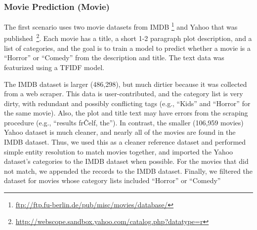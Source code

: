 \subsubsection{Movie Prediction (Movie)}\label{imdb}
The first scenario uses two movie datasets from IMDB \footnote{\tiny \url{ftp://ftp.fu-berlin.de/pub/misc/movies/database/}} and Yahoo that was published~\footnote{\tiny \url{http://webscope.sandbox.yahoo.com/catalog.php?datatype=r}}.
Each movie has a title, a short 1-2 paragraph plot description, and a list of categories, and the goal is to train a model to predict whether a movie is a ``Horror'' or ``Comedy'' from the description and title.  
The text data was featurized using a TFIDF model.

The IMDB dataset is larger (486,298), but much dirtier because it was collected from a web scraper.  
This data is user-contributed, and the category list is very dirty, with redundant and possibly conflicting tags (e.g., ``Kids'' and ``Horror'' for the same movie).  
Also, the plot and title text may have errors from the scraping procedure (e.g., ``results fr\^Celf, the'').
In contrast, the smaller (106,959 movies) Yahoo dataset is much cleaner, and nearly all of the movies are found in the IMDB dataset.
Thus, we used this as a cleaner reference dataset and performed simple entity resolution to match movies together, and imported the Yahoo dataset's categories to the IMDB dataset when possible.
For the movies that did not match, we appended the records to the IMDB dataset.
Finally, we filtered the dataset for movies whose category lists included ``Horror'' or ``Comedy''

% 


